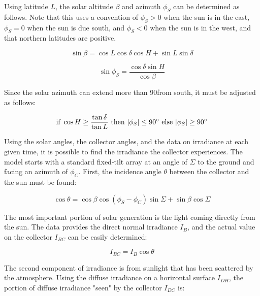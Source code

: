 \documentclass{article}
\begin{document}
Using latitude $L$, the solar altitude $\beta$ and azimuth $\phi_S$ can be determined as follows.  Note that this uses a convention of $\phi_S > 0$ when the sun is in the east, $\phi_S = 0$ when the sun is due south, and $\phi_S < 0$ when the sun is in the west, and that northern latitudes are positive.

\begin{equation}
\sin \beta = \cos L \cos \delta \cos H + \sin L \sin \delta
\label{eq:altitude}
\end{equation}

\begin{equation}
\sin \phi_S = \frac{\cos \delta \sin H}{\cos \beta}
\label{eq:azimuth}
\end{equation}

Since the solar azimuth can extend more than 90\degree from south, it must be adjusted as follows:

\begin{equation}
\mbox{if } \cos H \geq \frac{\tan \delta}{\tan L} \mbox{ then } |\phi_S | \leq 90\degree \mbox{ else } |\phi_S | \geq 90\degree
\label{eq:azimuth2}
\end{equation}

Using the solar angles, the collector angles, and the data on irradiance at each given time, it is possible to find the irradiance the collector experiences.  The model starts with a standard fixed-tilt array at an angle of $\Sigma$ to the ground and facing an azimuth of $\phi_C$.  First, the incidence angle $\theta$ between the collector and the sun must be found:

\begin{equation}
\cos \theta = \cos \beta \cos \left(\phi_S - \phi_C\right) \sin \Sigma + \sin \beta \cos \Sigma
\label{eq:theta_fixed}
\end{equation}

The most important portion of solar generation is the light coming directly from the sun.  The data provides the direct normal irradiance $I_B$, and the actual value on the collector $I_{\mathit{BC}}$ can be easily determined:

\begin{equation}
I_{\mathit{BC}} = I_B \cos \theta
\label{eq:direct}
\end{equation}

The second component of irradiance is from sunlight that has been scattered by the atmosphere.  Using the diffuse irradiance on a horizontal surface $I_{\mathit{DH}}$, the portion of diffuse irradiance "seen" by the collector $I_{\mathit{DC}}$ is:
\end{document}
